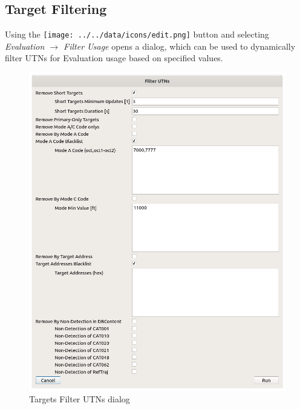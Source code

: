 \subsection{Target Filtering}
\label{sec:ui_target_filtering}

Using the \texttt{[image: ../../data/icons/edit.png]} button and selecting \textit{Evaluation $\rightarrow$ Filter Usage} opens a dialog, 
which can be used to dynamically filter UTNs for Evaluation usage based on specified values.

\begin{figure}[H]
    \includegraphics[width=15cm]{figures/filter_utns.png}
  \caption{Targets Filter UTNs dialog}
\end{figure}

